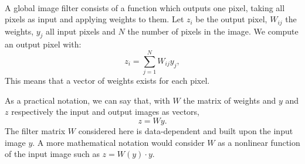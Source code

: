 \paragraph{}
A global image filter consists of a function which outputs one pixel, taking all pixels as input and applying weights to them.
Let \(z_i\) be the output pixel, \(W_{ij}\) the weights, \(y_j\) all input pixels and \(N\) the number of pixels in the image.
We compute an output pixel with:
\[z_i = \sum^{N}_{j=1} W_{ij}y_j,\]
This means that a vector of weights exists for each pixel.

As a practical notation, we can say that, with \(W\) the matrix of weights and \(y\) and \(z\) respectively the input and output images as vectors,
\[z = Wy.\]
The filter matrix \(W\) considered here is data-dependent and built upon the input image \(y\).
A more mathematical notation would consider \(W\) as a nonlinear function of the input image such as \(z = W(y) \cdot y\).
